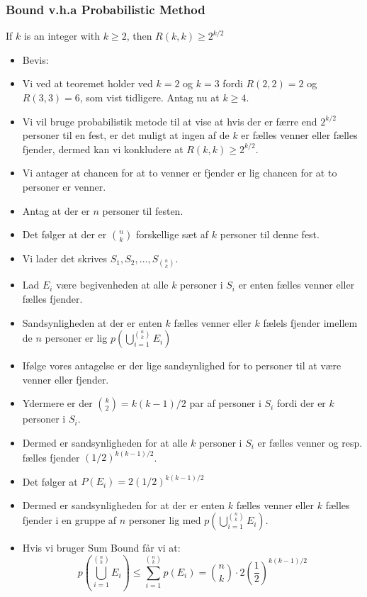 \documentclass{beamer}
\begin{document}
\begin{frame}[allowframebreaks]
  \frametitle{Bound v.h.a Probabilistic Method}
  \begin{theorem}[4]
If $k$ is an integer with $k \geq 2$, then $R(k,k) \geq 2^{k/2}$
\end{theorem}
\begin{itemize}
\item Bevis: 
\item Vi ved at teoremet holder ved $k = 2$ og $k = 3$ fordi $R(2,2) = 2$ og $R(3,3) = 6$, som vist tidligere. Antag nu at $k \geq 4$. 
\item Vi vil bruge probabilistik metode til at vise at hvis der er færre end $2^{k/2}$ personer til en fest, er det muligt at ingen af de $k$ er fælles venner eller fælles fjender, dermed kan vi konkludere at $R(k,k) \geq 2^{k/2}$.
\item Vi antager at chancen for at to venner er fjender er lig chancen for at to personer er venner.
\item Antag at der er $n$ personer til festen. 
\item Det følger at der er $\binom{n}{k}$ forskellige sæt af $k$ personer til denne fest. 
\item Vi lader det skrives $S_{1}, S_{2}, \ldots, S_{\binom{n}{k}}$.
\item Lad $E_{i}$ være begivenheden at alle $k$ personer i $S_{i}$ er enten fælles venner eller fælles fjender. 
\item Sandsynligheden at der er enten $k$ fælles venner eller $k$ fælels fjender imellem de $n$ personer er lig $p(\bigcup\limits_{i=1}^{\binom{n}{k}}E_{i})$
\item Ifølge vores antagelse er der lige sandsynlighed for to personer til at være venner eller fjender. 
\item Ydermere er der $\binom{k}{2} = k(k-1)/2$ par af personer i $S_{i}$ fordi der er $k$ personer i $S_{i}$. 
\item Dermed er sandsynligheden for at alle $k$ personer i $S_i$ er fælles venner og resp. fælles fjender $(1/2)^{k(k-1)/2}$. 
\item Det følger at $P(E_{i}) = 2(1/2)^{k(k-1)/2}$
\item Dermed er sandsynligheden for at der er enten $k$ fælles venner eller $k$ fælles fjender i en gruppe af $n$ personer lig med $p(\bigcup\limits_{i=1}^{\binom{n}{k}}E_{i})$.
\item Hvis vi bruger Sum Bound får vi at: \[ p \left( \bigcup\limits_{i=1}^{\binom{n}{k}}E_i \right) \leq \sum_{i=1}^{\binom{n}{k}} p(E_{i}) = \binom{n}{k} \cdot 2 \left( \frac{1}{2} \right)^{k(k-1)/2}\]

\end{itemize}
\end{frame}
\end{document}
